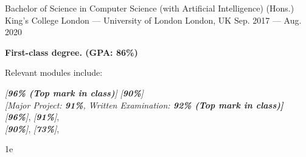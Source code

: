 \begin{cventries}
    \cventry
    {Bachelor of Science in Computer Science (with Artificial Intelligence) (Hons.)} %
    {King’s College London --- University of London} %
    {London, UK} %
    {Sep. 2017 --- Aug. 2020} %
    {
        \begin{cvitems} %
            \item {\textbf{First-class degree. (GPA: 86\%)}}
            \item {Relevant modules include:
                        \begin{flushleft}
                            \bsep {}  \textit{[\textbf{96\% (Top mark in class)}]}
                            \bsep {} \textit{[\textbf{90\%}]}\\
                             \textit{[Major Project: \textbf{91\%}, Written Examination: \textbf{92\% (Top mark in class)]}}\\
                             \textit{[\textbf{96\%}]},
                             \textit{[\textbf{91\%}]}, \\
                             \textit{[\textbf{90\%}]},
                             \textit{[\textbf{73\%}]},\\
                        \end{flushleft}
                  }
        \end{cvitems}
1e    }


\end{cventries}

